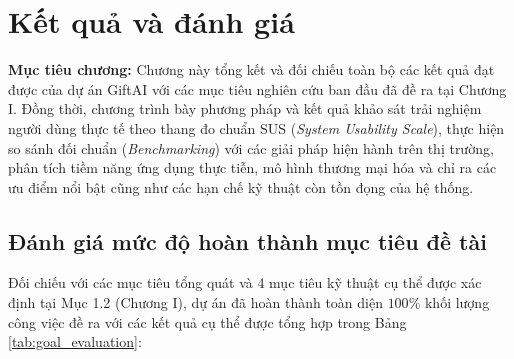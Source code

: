 
\chapter{Kết quả và đánh giá}
\label{chap:chuong6}

\begin{infobox}
\textbf{Mục tiêu chương:}
Chương này tổng kết và đối chiếu toàn bộ các kết quả đạt được của dự án GiftAI với các mục tiêu nghiên cứu ban đầu đã đề ra tại Chương I. Đồng thời, chương trình bày phương pháp và kết quả khảo sát trải nghiệm người dùng thực tế theo thang đo chuẩn SUS (\textit{System Usability Scale}), thực hiện so sánh đối chuẩn (\textit{Benchmarking}) với các giải pháp hiện hành trên thị trường, phân tích tiềm năng ứng dụng thực tiễn, mô hình thương mại hóa và chỉ ra các ưu điểm nổi bật cũng như các hạn chế kỹ thuật còn tồn đọng của hệ thống.
\end{infobox}

\section{Đánh giá mức độ hoàn thành mục tiêu đề tài}

Đối chiếu với các mục tiêu tổng quát và 4 mục tiêu kỹ thuật cụ thể được xác định tại Mục 1.2 (Chương I), dự án đã hoàn thành toàn diện $100\%$ khối lượng công việc đề ra với các kết quả cụ thể được tổng hợp trong Bảng \ref{tab:goal_evaluation}:

